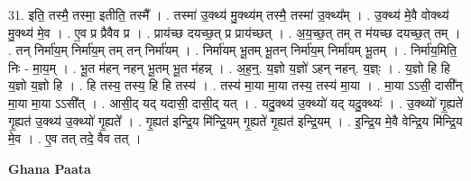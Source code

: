 \documentclass[17pt]{extarticle}
\begin{document}
31. इति॒ तस्मै॒ तस्मा॒ इतीति॒ तस्मै᳚ । . तस्मा॑ उ॒क्थ्य॑ मु॒क्थ्य॑म् तस्मै॒ तस्मा॑ उ॒क्थ्य᳚म् । . उ॒क्थ्य॑ मे॒वै वोक्थ्य॑ मु॒क्थ्य॑ मे॒व । . ए॒व प्र प्रैवैव प्र । . प्राय॑च्छ दयच्छ॒त् प्र प्राय॑च्छत् । . अ॒य॒च्छ॒त् तम् त म॑यच्छ दयच्छ॒त् तम् । . तन् निर्मा॑य॒म् निर्मा॑य॒म् तम् तन् निर्मा॑यम् । . निर्मा॑यम् भू॒तम् भू॒तन् निर्मा॑य॒म् निर्मा॑यम् भू॒तम् । . निर्मा॑य॒मिति॒ निः - मा॒य॒म् । . भू॒त म॑हन् नहन् भू॒तम् भू॒त म॑हन्न् । . अ॒ह॒न्॒. य॒ज्ञो य॒ज्ञो॑ ऽहन् नहन्. य॒ज्ञ्ः । . य॒ज्ञो हि हि य॒ज्ञो य॒ज्ञो हि । . हि तस्य॒ तस्य॒ हि हि तस्य॑ । . तस्य॑ मा॒या मा॒या तस्य॒ तस्य॑ मा॒या । . मा॒या ऽऽसी॒ दासी᳚न् मा॒या मा॒या ऽऽसी᳚त् । . आसी॒द् यद् यदासी॒ दासी॒द् यत् । . यदु॒क्थ्य॑ उ॒क्थ्यो॑ यद् यदु॒क्थ्यः॑ । . उ॒क्थ्यो॑ गृ॒ह्यते॑ गृ॒ह्यत॑ उ॒क्थ्य॑ उ॒क्थ्यो॑ गृ॒ह्यते᳚ । . गृ॒ह्यत॑ इन्द्रि॒य मि॑न्द्रि॒यम् गृ॒ह्यते॑ गृ॒ह्यत॑ इन्द्रि॒यम् । . इ॒न्द्रि॒य मे॒वै वेन्द्रि॒य मि॑न्द्रि॒य मे॒व । . ए॒व तत् तदे॒ वैव तत् । \newline

\textbf{Ghana Paata } \newline
\end{document}
